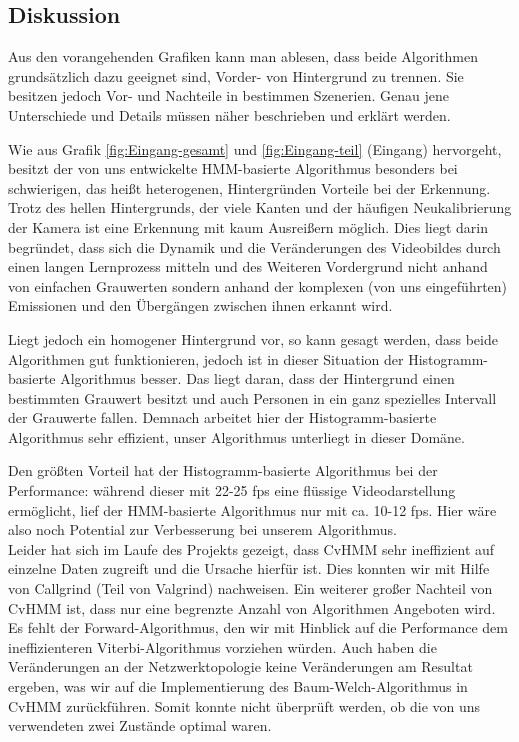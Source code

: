 \subsection{Diskussion}
\label{sec:diskuss}
Aus den vorangehenden Grafiken kann man ablesen, dass beide Algorithmen grundsätzlich dazu geeignet sind, Vorder- von Hintergrund zu trennen. Sie besitzen jedoch Vor- und Nachteile in bestimmen Szenerien. Genau jene Unterschiede und Details müssen näher beschrieben und erklärt werden.

Wie aus Grafik \ref{fig:Eingang-gesamt} und \ref{fig:Eingang-teil} (Eingang) hervorgeht, besitzt der von uns entwickelte HMM-basierte Algorithmus besonders bei schwierigen, das heißt heterogenen, Hintergründen Vorteile bei der Erkennung. Trotz des hellen Hintergrunds, der viele Kanten und der häufigen Neukalibrierung der Kamera ist eine Erkennung mit kaum Ausreißern möglich. Dies liegt darin begründet, dass sich die Dynamik und die Veränderungen des Videobildes durch einen langen Lernprozess mitteln und des Weiteren Vordergrund nicht anhand von einfachen Grauwerten sondern anhand der komplexen (von uns eingeführten) Emissionen und den Übergängen zwischen ihnen erkannt wird.

Liegt jedoch ein homogener Hintergrund vor, so kann gesagt werden, dass beide Algorithmen gut funktionieren, jedoch ist in dieser Situation der Histogramm-basierte Algorithmus besser. Das liegt daran, dass der Hintergrund einen bestimmten Grauwert besitzt und auch Personen in ein ganz spezielles Intervall der Grauwerte fallen. Demnach arbeitet hier der Histogramm-basierte Algorithmus sehr effizient, unser Algorithmus unterliegt in dieser Domäne.

Den größten Vorteil hat der Histogramm-basierte Algorithmus bei der Performance: während dieser mit 22-25 fps eine flüssige Videodarstellung ermöglicht, lief der HMM-basierte Algorithmus nur mit ca. 10-12 fps. Hier wäre also noch Potential zur Verbesserung bei unserem Algorithmus.\\
Leider hat sich im Laufe des Projekts gezeigt, dass CvHMM sehr ineffizient auf einzelne Daten zugreift und die Ursache hierfür ist. Dies konnten wir mit Hilfe von Callgrind (Teil von Valgrind) nachweisen. Ein weiterer großer Nachteil von CvHMM ist, dass nur eine begrenzte Anzahl von Algorithmen Angeboten wird. Es fehlt der Forward-Algorithmus, den wir mit Hinblick auf die Performance dem ineffizienteren Viterbi-Algorithmus vorziehen würden. Auch haben die Veränderungen an der Netzwerktopologie keine Veränderungen am Resultat ergeben, was wir auf die Implementierung des Baum-Welch-Algorithmus in CvHMM zurückführen. Somit konnte nicht überprüft werden, ob die von uns verwendeten zwei Zustände optimal waren.

